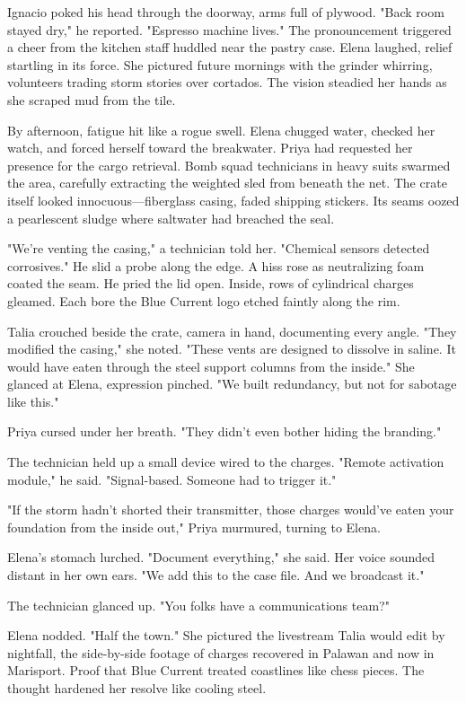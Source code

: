 Ignacio poked his head through the doorway, arms full of plywood. "Back room stayed dry," he reported. "Espresso machine lives." The pronouncement triggered a cheer from the kitchen staff huddled near the pastry case. Elena laughed, relief startling in its force. She pictured future mornings with the grinder whirring, volunteers trading storm stories over cortados. The vision steadied her hands as she scraped mud from the tile.

\bigskip

By afternoon, fatigue hit like a rogue swell. Elena chugged water, checked her watch, and forced herself toward the breakwater. Priya had requested her presence for the cargo retrieval. Bomb squad technicians in heavy suits swarmed the area, carefully extracting the weighted sled from beneath the net. The crate itself looked innocuous—fiberglass casing, faded shipping stickers. Its seams oozed a pearlescent sludge where saltwater had breached the seal.

"We're venting the casing," a technician told her. "Chemical sensors detected corrosives." He slid a probe along the edge. A hiss rose as neutralizing foam coated the seam. He pried the lid open. Inside, rows of cylindrical charges gleamed. Each bore the Blue Current logo etched faintly along the rim.

Talia crouched beside the crate, camera in hand, documenting every angle. "They modified the casing," she noted. "These vents are designed to dissolve in saline. It would have eaten through the steel support columns from the inside." She glanced at Elena, expression pinched. "We built redundancy, but not for sabotage like this."

Priya cursed under her breath. "They didn't even bother hiding the branding."

The technician held up a small device wired to the charges. "Remote activation module," he said. "Signal-based. Someone had to trigger it."

"If the storm hadn't shorted their transmitter, those charges would've eaten your foundation from the inside out," Priya murmured, turning to Elena.

Elena's stomach lurched. "Document everything," she said. Her voice sounded distant in her own ears. "We add this to the case file. And we broadcast it."

The technician glanced up. "You folks have a communications team?"

Elena nodded. "Half the town." She pictured the livestream Talia would edit by nightfall, the side-by-side footage of charges recovered in Palawan and now in Marisport. Proof that Blue Current treated coastlines like chess pieces. The thought hardened her resolve like cooling steel.

